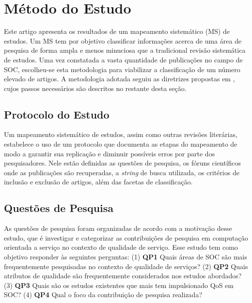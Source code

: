 
\section{Método do Estudo}\label{sec:review_method}

Este artigo apresenta os resultados de um mapeamento sistemático (MS) de estudos. Um MS tem por objetivo classificar informações acerca de uma área de pesquisa de forma ampla e menos minuciosa que a tradicional revisão sistemática de estudos. Uma vez constatada a vasta quantidade de publicações no campo de SOC, escolheu-se esta metodologia para viabilizar a classifica\c c\~{a}o de um número elevado de artigos. A metodologia adotada seguiu as diretrizes propostas em \cite{petersen:sms2008}, cujos passos necess\'{a}rios s\~{a}o descritos no restante desta se\c c\~{a}o.

\subsection{Protocolo do Estudo}

Um mapeamento sistemático de estudos, assim como outras revisões literárias, estabelece o uso de um protocolo que documenta as etapas do mapeamento de modo a garantir sua replicação e diminuir possíveis erros por parte dos pesquisadores. Nele estão definidas as questões de pesquisa, os fóruns científicos onde as publicações s\~{a}o recuperadas, a \textit{string} de busca utilizada, os critérios de inclusão e exclusão de artigos, além das facetas de classificação.

\subsection{Quest\~{o}es de Pesquisa}\label{sec:questoesPesquisa}

As questões de pesquisa foram organizadas de acordo com a motivação desse estudo, que é investigar e categorizar as contribuições de pesquisa em computação orientada a serviço no contexto de qualidade de serviço. Esse estudo tem como objetivo responder às seguintes perguntas: (1) \textbf{QP1} Quais áreas de SOC são mais frequentemente pesquisadas no contexto de qualidade de serviços? (2) \textbf{QP2} Quais atributos de qualidade são frequentemente considerados nos estudos abordados? (3) \textbf{QP3} Quais s\~{a}o os estudos existentes que mais tem impulsionado QoS em SOC? (4) \textbf{QP4} Qual o foco da contribuição de pesquisa realizada?

